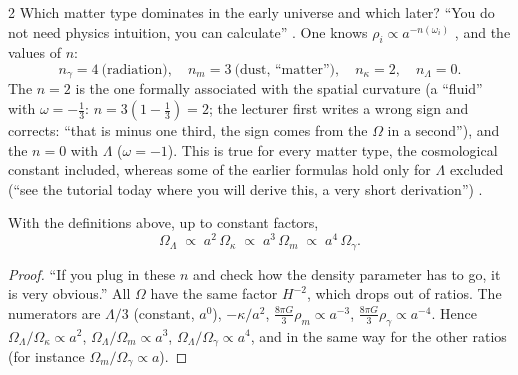 \begin{paracol}{2}
Which matter type dominates in the early universe and which later? ``You do not need physics intuition, you can calculate'' . One knows $\rho_i\propto a^{-n(\omega_i)}$ , and the values of $n$:
\[
  n_\gamma=4\ \text{(radiation)},\quad n_m=3\ \text{(dust, ``matter'')},\quad n_\kappa=2,\quad n_\Lambda=0 .
\]
The $n=2$ is the one formally associated with the spatial curvature (a ``fluid'' with $\omega=-\tfrac13$: $n=3(1-\tfrac13)=2$; the lecturer first writes a wrong sign and corrects: ``that is minus one third, the sign comes from the $\Omega$ in a second''), and the $n=0$ with $\Lambda$ ($\omega=-1$). This is true for every matter type, the cosmological constant included, whereas some of the earlier formulas hold only for $\Lambda$ excluded (``see the tutorial today where you will derive this, a very short derivation'') .

\begin{theorem}\label{thm:c21-scaling}
With the definitions above, up to constant factors,
\[
  \Omega_\Lambda\;\propto\;a^{2}\,\Omega_\kappa\;\propto\;a^{3}\,\Omega_m\;\propto\;a^{4}\,\Omega_\gamma .
\]
\end{theorem}
\begin{proof}
``If you plug in these $n$ and check how the density parameter has to go, it is very obvious.'' All $\Omega$ have the same factor $H^{-2}$, which drops out of ratios. The numerators are $\Lambda/3$ (constant, $a^0$), $-\kappa/a^2$, $\frac{8\pi G}{3}\rho_m\propto a^{-3}$, $\frac{8\pi G}{3}\rho_\gamma\propto a^{-4}$. Hence $\Omega_\Lambda/\Omega_\kappa\propto a^2$, $\Omega_\Lambda/\Omega_m\propto a^3$, $\Omega_\Lambda/\Omega_\gamma\propto a^4$, and in the same way for the other ratios (for instance $\Omega_m/\Omega_\gamma\propto a$).
\end{proof}


\end{paracol}
